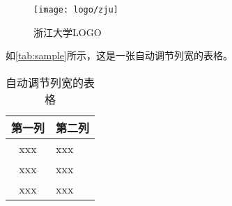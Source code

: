 \begin{figure}[!h]
    \centering
    \texttt{[image: logo/zju]}
    \caption{\label{fig:zju-logo}浙江大学LOGO}
\end{figure}

\par 如\autoref{tab:sample}所示，这是一张自动调节列宽的表格。

\begin{table}[!h]
    \caption{\label{tab:sample}自动调节列宽的表格}
    \begin{tabularx}{\linewidth}{c|X<{\centering}}
        \hline
        第一列 & 第二列 \\ \hline
        xxx & xxx \\ \hline
        xxx & xxx \\ \hline
        xxx & xxx \\ \hline
    \end{tabularx}
\end{table}
